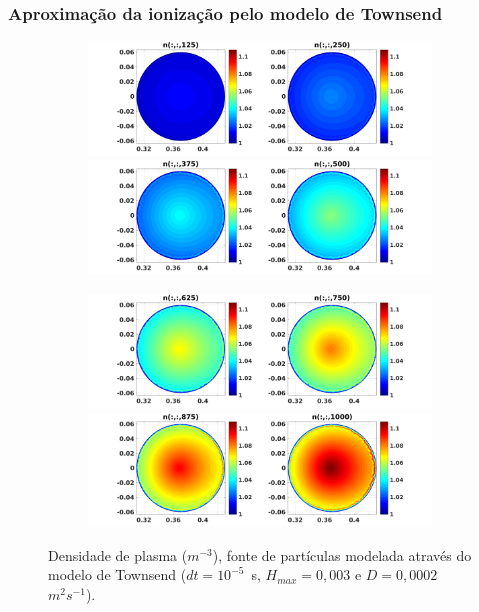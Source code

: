 \documentclass[aspectratio=169]{beamer}
\begin{document}
\begin{frame}		
\frametitle{Aproximação da ionização pelo modelo de Townsend}

\begin{figure}[H]
\begin{subfigure}{0.43\textwidth}
\includegraphics[scale=0.24]{../SImulacao_breakdown/PDE/ntod1B2.png}  
\includegraphics[scale=0.24]{../SImulacao_breakdown/PDE/ntod2B2.png}
\end{subfigure}
\begin{subfigure}{0.43\textwidth}
\includegraphics[scale=0.24]{../SImulacao_breakdown/PDE/ntod3B2.png} 
\includegraphics[scale=0.24]{../SImulacao_breakdown/PDE/ntod4B2.png}
\end{subfigure}	
\caption{Densidade de plasma ($m^{-3}$), fonte de partículas modelada através do modelo de Townsend ($dt=10^{-5}$\ s, $H_{max} = 0,003$ e $D=0,0002$\ $m^2s^{-1}$).}
\end{figure}
\end{frame}
	
\end{document}

